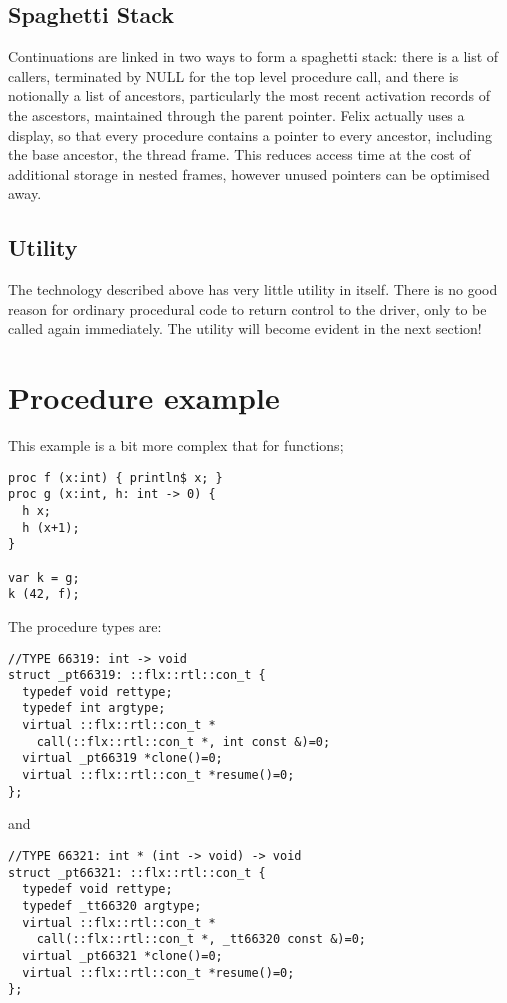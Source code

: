 \documentclass[oneside]{book}
\begin{document}
\subsection{Spaghetti Stack}
Continuations are linked in two ways to form a spaghetti stack: there is a list
of callers, terminated by NULL for the top level procedure call, and there
is notionally a list of ancestors, particularly the most recent activation records
of the ascestors, maintained through the parent pointer. Felix actually uses a display,
so that every procedure contains a pointer to every ancestor, including the base
ancestor, the thread frame. This reduces access time at the cost of additional storage
in nested frames, however unused pointers can be optimised away.

\subsection{Utility}
The technology described above has very little utility in itself. There is
no good reason for ordinary procedural code to return control to the driver,
only to be called again immediately. The utility will become evident in
the next section!

\section{Procedure example}
This example is a bit more complex that for functions;
\begin{verbatim}
proc f (x:int) { println$ x; }
proc g (x:int, h: int -> 0) {
  h x;
  h (x+1);
}

var k = g;
k (42, f);
\end{verbatim}

The procedure types are:
\begin{verbatim}
//TYPE 66319: int -> void
struct _pt66319: ::flx::rtl::con_t {
  typedef void rettype;
  typedef int argtype;
  virtual ::flx::rtl::con_t *
    call(::flx::rtl::con_t *, int const &)=0;
  virtual _pt66319 *clone()=0;
  virtual ::flx::rtl::con_t *resume()=0;
};
\end{verbatim}
and
\begin{verbatim}
//TYPE 66321: int * (int -> void) -> void
struct _pt66321: ::flx::rtl::con_t {
  typedef void rettype;
  typedef _tt66320 argtype;
  virtual ::flx::rtl::con_t *
    call(::flx::rtl::con_t *, _tt66320 const &)=0;
  virtual _pt66321 *clone()=0;
  virtual ::flx::rtl::con_t *resume()=0;
};
\end{verbatim}
\end{document}
